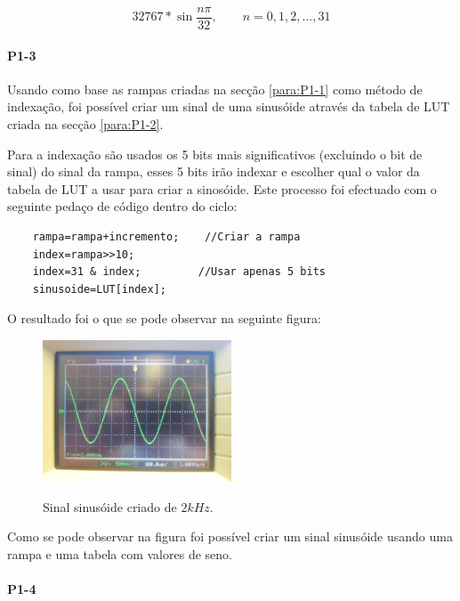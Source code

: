 \documentclass[11pt]{article}
\begin{document}
\begin{equation}
32767*\sin \dfrac{n \pi}{32},  \quad \quad n=0,1,2,...,31
\end{equation}

\paragraph{P1-3}
\label{para:P1-3}

Usando como base as rampas criadas na secção \ref{para:P1-1} como método de indexação, foi possível criar um sinal de uma sinusóide através da tabela de LUT criada na secção \ref{para:P1-2}.

Para a indexação são usados os 5 bits mais significativos (excluindo o bit de sinal) do sinal da rampa, esses 5 bits irão indexar e escolher qual o valor da tabela de LUT a usar para criar a sinosóide. Este processo foi efectuado com o seguinte pedaço de código dentro do ciclo:

\begin{lstlisting}
	rampa=rampa+incremento;    //Criar a rampa
	index=rampa>>10;
	index=31 & index;         //Usar apenas 5 bits
	sinusoide=LUT[index];
\end{lstlisting}

O resultado foi o que se pode observar na seguinte figura:

\begin{figure}[H]
	\centering
	\includegraphics[width=0.5\textwidth]{./P1_1seno}~\\
	\caption{Sinal sinusóide criado de $ 2 kHz $.}
\end{figure}

Como se pode observar na figura foi possível criar um sinal sinusóide usando uma rampa e uma tabela com valores de seno.

\paragraph{P1-4}
\label{para:P1-4}
\end{document}
